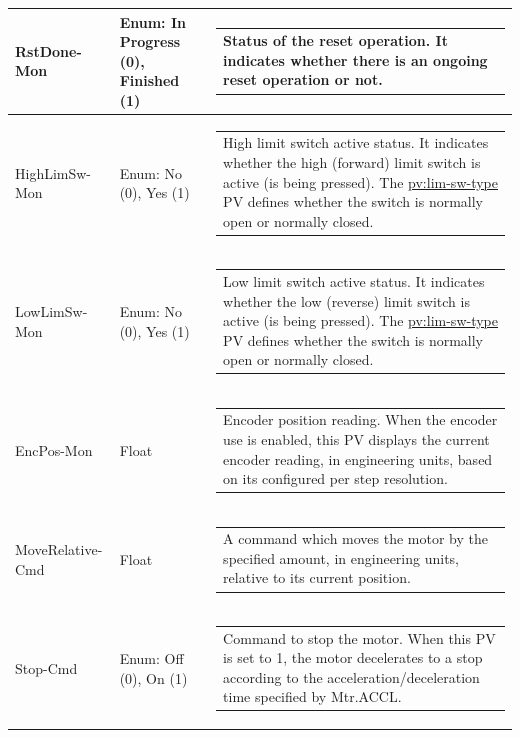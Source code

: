 \documentclass[openany]{article}
\begin{document}
\begin{longtable}{| m{4.5cm} m{2.5cm}  m{8.5cm} |}
        RstDone-Mon & Enum: In Progress (0), Finished (1) & \begin{tabular}{@{}m{6cm}@{}}
                Status of the reset operation. It indicates whether there is an ongoing reset operation or not.
            \end{tabular} \hypertarget{pv:high-lim-sw-mon}{}\\ \hline
        HighLimSw-Mon & Enum: No (0), Yes (1) & \begin{tabular}{@{}m{6cm}@{}}
                High limit switch active status. It indicates whether the high (forward) limit switch is active (is being pressed). The \hyperlink{limit switch type}{pv:lim-sw-type} PV defines whether the switch is normally open or normally closed.
            \end{tabular} \hypertarget{pv:low-lim-sw-mon}{}\\ \hline
        LowLimSw-Mon & Enum: No (0), Yes (1) & \begin{tabular}{@{}m{6cm}@{}}
                Low limit switch active status. It indicates whether the low (reverse) limit switch is active (is being pressed). The \hyperlink{limit switch type}{pv:lim-sw-type} PV defines whether the switch is normally open or normally closed.
            \end{tabular} \hypertarget{pv:enc-pos-mon}{}\\ \hline
        EncPos-Mon & Float & \begin{tabular}{@{}m{6cm}@{}}
                Encoder position reading. When the encoder use is enabled, this PV displays the current encoder reading, in engineering units, based on its configured per step resolution.
            \end{tabular} \hypertarget{pv:move-relative-cmd}{}\\ \hline
        MoveRelative-Cmd & Float & \begin{tabular}{@{}m{6cm}@{}}
                A command which moves the motor by the specified amount, in engineering units, relative to its current position.
            \end{tabular} \hypertarget{pv:stop-cmd}{}\\ \hline
        Stop-Cmd & Enum: Off (0), On (1) & \begin{tabular}{@{}m{6cm}@{}}
                Command to stop the motor. When this PV is set to 1, the motor decelerates to a stop according to the acceleration/deceleration time specified by Mtr.ACCL.

\end{tabular}
\end{longtable}
\end{document}
